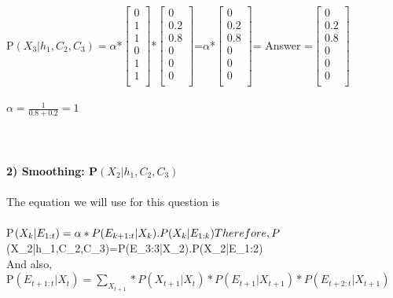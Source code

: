 \documentclass[11pt,a4paper]{article}
\begin{document}
P$(X_{3}|h_{1},C_{2},C_{3})=\alpha$*$\begin{bmatrix}
0\\
1\\
1\\
0\\
1\\
1\\
\end{bmatrix}$*$\begin{bmatrix}
0\\
0.2\\
0.8\\
0\\
0\\
0\\
\end{bmatrix}$=$\alpha$*$\begin{bmatrix}
0\\
0.2\\
0.8\\
0\\
0\\
0\\
\end{bmatrix}$= Answer =$\begin{bmatrix}
0\\
0.2\\
0.8\\
0\\
0\\
0\\
\end{bmatrix}$\\\\
$\alpha=\frac{1}{0.8+0.2}=1$\\\\\\\\
\textbf{2) Smoothing: P$(X_{2}|h_{1}, C_{2}, C_{3})$\\\\}
The equation we will use for this question is\\\\
P$(X_{k}|E_{1:t})=\alpha*P(E_{k+1:t}|X_{k}).P(X_{k}|E_{1:k})\\\\
Therefore,\\
P$(X_{2}|h_{1},C_{2},C_{3})=\alpha*P(E_{3:3}|X_{2}).P(X_{2}|E_{1:2})\\
And also,\\
P$(E_{t+1:t}|X_{t})=\sum_{X_{t+1}}*P(X_{t+1}|X_{t})*P(E_{t+1}|X_{t+1})*P(E_{t+2:t}|X_{t+1})$\\
\end{document}
